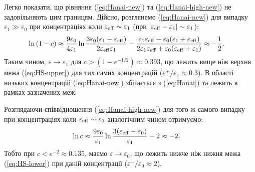 \documentclass[14pt,twoside]{vakthesis}
\begin{document}
Легко показати, що рівняння (\ref{eq:Hanai-new}) та (\ref{eq:Hanai-high-new}) не задовільняють цим границям. Дійсно, розглянемо (\ref{eq:Hanai-new}) для випадку $\varepsilon_1 \gg \varepsilon_0$ при концентраціях коли $\varepsilon_{\rm eff} \sim \varepsilon_1$ (при $|\varepsilon_{\rm eff} - \varepsilon_1| \sim \varepsilon_1$): 
\begin{equation}
\begin{split}
\ln{(1-c)} &\approx \frac{9 \varepsilon_0}{4\varepsilon_1} \ln{ \frac{3\varepsilon_0 (\varepsilon_1-\varepsilon_{\rm eff})}{2\varepsilon_{\rm eff} \varepsilon_1} }
- \frac{\varepsilon_1 \varepsilon_{\rm eff} - \varepsilon_0 ( \varepsilon_1 + \varepsilon_{\rm eff})}{2\varepsilon_1 \varepsilon_{\rm eff} + \varepsilon_0 (\varepsilon_{\rm eff} + \varepsilon_1)} \approx - \frac{1}{2}.
\end{split}
\end{equation}
Таким чином, $\varepsilon \to \varepsilon_1$ для $c > (1 - e^{-1/2}) \approx 0.393$, що лежить вище ніж верхня межа (\ref{eq:HS-upper}) для тих самих концентрацій ($\varepsilon^{+}/\varepsilon_1 \approx 0.3$). В області низьких концентрацій (\ref{eq:Hanai-new}) збігається з (\ref{eq:Hanai}) та лежить в рамках зазначених меж. 

Розглядаючи співвідношення (\ref{eq:Hanai-high-new}) для того ж самого випадку при концентраціях коли $\varepsilon_{\rm eff} \sim \varepsilon_0$ аналогічним чином отримуємо:
\begin{equation}
\begin{split}
\ln{c} &\approx \frac{9 \varepsilon_0}{\varepsilon_1} \ln{ \frac{3(\varepsilon_{\rm eff} - \varepsilon_0)}{\varepsilon_1} }
- 2 \approx -2.
\end{split}
\end{equation}
Тобто при $c < e^{-2} \approx 0.135$, маємо $\varepsilon \to \varepsilon_0$, що лежить нижче ніж нижня межа (\ref{eq:HS-lower}) при даній концентрації ($\varepsilon^{-}/\varepsilon_0 \approx 2$).
\end{document}
